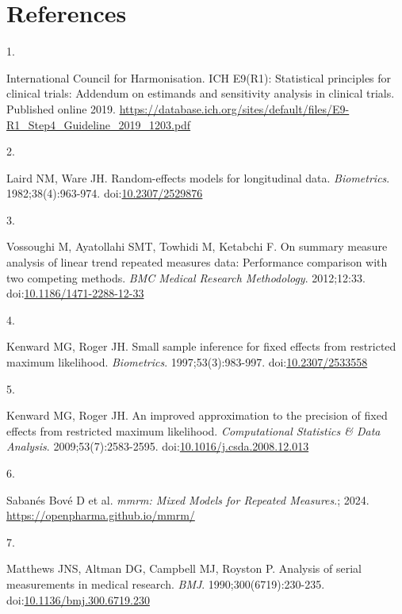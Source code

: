 \documentclass[
  11pt,
]{article}
\newlength{\cslhangindent}
\newlength{\csllabelwidth}
\newenvironment{CSLReferences}[2] %
 {\begin{list}{}{%
  \setlength{\itemindent}{0pt}
  \setlength{\leftmargin}{0pt}
  \setlength{\parsep}{0pt}
  \ifodd #1
   \setlength{\leftmargin}{\cslhangindent}
   \setlength{\itemindent}{-1\cslhangindent}
  \fi
  \setlength{\itemsep}{#2\baselineskip}}}
 {\end{list}}
\newcommand{\CSLLeftMargin}[1]{\parbox[t]{\csllabelwidth}{\strut#1\strut}}
\newcommand{\CSLRightInline}[1]{\parbox[t]{\linewidth - \csllabelwidth}{\strut#1\strut}}
\begin{document}
\section*{References}\label{references}

\protect{}\label{refs}
\begin{CSLReferences}{0}{1}
\CSLLeftMargin{1. }%
\CSLRightInline{International Council for Harmonisation. {ICH E9(R1)}: Statistical principles for clinical trials: Addendum on estimands and sensitivity analysis in clinical trials. Published online 2019. \url{https://database.ich.org/sites/default/files/E9-R1_Step4_Guideline_2019_1203.pdf}}

\CSLLeftMargin{2. }%
\CSLRightInline{Laird NM, Ware JH. Random-effects models for longitudinal data. \emph{Biometrics}. 1982;38(4):963-974. doi:\href{https://doi.org/10.2307/2529876}{10.2307/2529876}}

\CSLLeftMargin{3. }%
\CSLRightInline{Vossoughi M, Ayatollahi SMT, Towhidi M, Ketabchi F. On summary measure analysis of linear trend repeated measures data: Performance comparison with two competing methods. \emph{BMC Medical Research Methodology}. 2012;12:33. doi:\href{https://doi.org/10.1186/1471-2288-12-33}{10.1186/1471-2288-12-33}}

\CSLLeftMargin{4. }%
\CSLRightInline{Kenward MG, Roger JH. Small sample inference for fixed effects from restricted maximum likelihood. \emph{Biometrics}. 1997;53(3):983-997. doi:\href{https://doi.org/10.2307/2533558}{10.2307/2533558}}

\CSLLeftMargin{5. }%
\CSLRightInline{Kenward MG, Roger JH. An improved approximation to the precision of fixed effects from restricted maximum likelihood. \emph{Computational Statistics \& Data Analysis}. 2009;53(7):2583-2595. doi:\href{https://doi.org/10.1016/j.csda.2008.12.013}{10.1016/j.csda.2008.12.013}}

\CSLLeftMargin{6. }%
\CSLRightInline{{Sabanés Bové D et al.} \emph{{mmrm}: Mixed Models for Repeated Measures}.; 2024. \url{https://openpharma.github.io/mmrm/}}

\CSLLeftMargin{7. }%
\CSLRightInline{Matthews JNS, Altman DG, Campbell MJ, Royston P. Analysis of serial measurements in medical research. \emph{BMJ}. 1990;300(6719):230-235. doi:\href{https://doi.org/10.1136/bmj.300.6719.230}{10.1136/bmj.300.6719.230}}


\end{CSLReferences}
\end{document}
